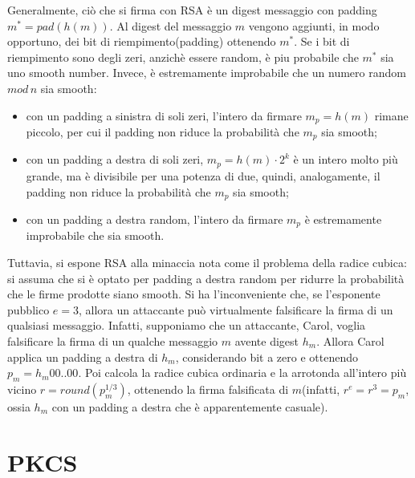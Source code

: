 Generalmente, ciò che si firma con RSA è un digest messaggio con padding $m^{*} = pad(h(m))$. Al digest del messaggio $m$ vengono aggiunti, in modo opportuno, dei bit di riempimento(padding) ottenendo $m^*$. Se i bit di riempimento sono degli zeri, anzichè essere random, è piu probabile che $m^*$ sia uno smooth number. Invece, è estremamente improbabile che un numero random $mod \, n$ sia smooth: \begin{itemize}
\item con un padding a sinistra di soli zeri, l'intero da firmare $m_{p} = h(m)$ rimane piccolo, per cui il padding non riduce la probabilità che $m_{p}$ sia smooth;
\item con un padding a destra di soli zeri, $m_{p} = h(m) \cdot 2^k $ è un intero molto più grande, ma è divisibile per una potenza di due, quindi, analogamente, il padding non riduce la probabilità che $m_{p}$ sia smooth;
\item con un padding a destra random, l'intero da firmare $m_{p}$ è estremamente improbabile che sia smooth. 
\end{itemize}
Tuttavia, si espone RSA alla minaccia nota come il
problema della radice cubica: si assuma che si è optato per padding a destra random per ridurre la probabilità che le firme prodotte siano smooth. Si ha l'inconveniente che, se l'esponente pubblico $e = 3$, allora un attaccante può virtualmente falsificare la
firma di un qualsiasi messaggio. Infatti, supponiamo che un attaccante, Carol, voglia falsificare la firma di un qualche messaggio $m$ avente digest $h_{m}$. Allora Carol applica un padding a destra di $h_{m}$, considerando bit a zero e ottenendo $p_{m} = h_{m}00..00$. Poi calcola la radice cubica ordinaria e la arrotonda all'intero più vicino $r = round(p_{m}^{1/3})$, ottenendo la firma falsificata di $m$(infatti, $r^e = r^3 = p_{m}$, ossia $h_{m}$ con un padding a destra che è apparentemente casuale).

\section{PKCS}

